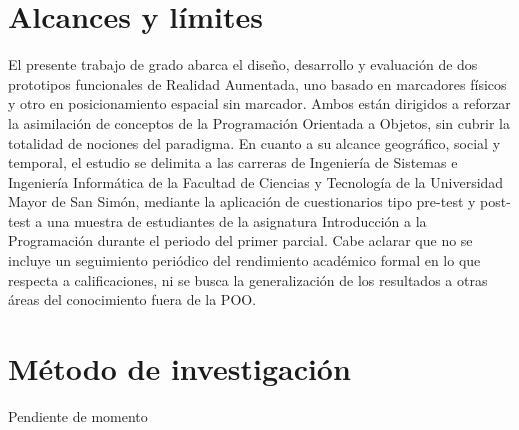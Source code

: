 \section{Alcances y límites}
El presente trabajo de grado abarca el diseño, desarrollo y evaluación de dos 
prototipos funcionales de Realidad Aumentada, uno basado en marcadores físicos 
y otro en posicionamiento espacial sin marcador. Ambos están dirigidos a 
reforzar la asimilación de conceptos de la Programación Orientada a Objetos, 
sin cubrir la totalidad de nociones del paradigma. En cuanto a su alcance 
geográfico, social y temporal, el estudio se delimita a las carreras de 
Ingeniería de Sistemas e Ingeniería Informática de la Facultad de Ciencias y 
Tecnología de la Universidad Mayor de San Simón, mediante la aplicación de 
cuestionarios tipo pre-test y post-test a una muestra de estudiantes de la 
asignatura Introducción a la Programación durante el periodo del primer 
parcial. Cabe aclarar que no se incluye un seguimiento periódico del 
rendimiento académico formal en lo que respecta a calificaciones, ni se busca 
la generalización de los resultados a otras áreas del conocimiento fuera de 
la POO.

\section{Método de investigación}
Pendiente de momento